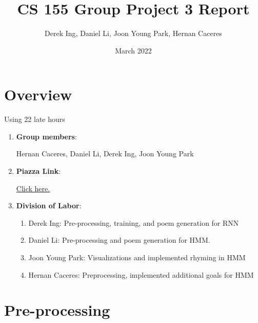 \documentclass{article}
\title{CS 155 Group Project 3 Report}
\author{Derek Ing, Daniel Li, Joon Young Park, Hernan Caceres}
\date{March 2022}
\begin{document}
\maketitle

\section{Overview}
Using 22 late hours
\begin{enumerate}
    \item \textbf{Group members}:
    \vspace{2mm} 
    
    Hernan Caceres, Daniel Li, Derek Ing, Joon Young Park
    
    \item \textbf{Piazza Link}:
    \vspace{1.5mm} 
    
    \href{https://piazza.com/class/kxhtyed0nmh2s?cid=527}{ 
Click here.} 
    
    \item \textbf{Division of Labor}:
    \vspace{1.5mm} 
    
    \begin{enumerate}

        \item Derek Ing: Pre-processing, training, and poem generation for RNN
        
        \item Daniel Li: Pre-processing and poem generation for HMM. 
        
        \item Joon Young Park: Visualizations and implemented rhyming in HMM
        
        \item Hernan Caceres: 
        Preprocessing, implemented additional goals for HMM
    \end{enumerate}
\end{enumerate}

\newpage

\section{Pre-processing}
\end{document}
